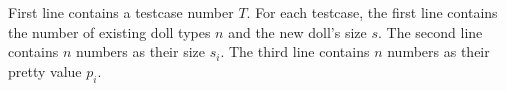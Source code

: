 First line contains a testcase number $T$. For each testcase, 
the first line contains the number of existing doll types $n$ and 
the new doll's size $s$. The second line contains $n$ numbers as 
their size $s_i$. The third line contains $n$ numbers as their pretty value $p_i$.
